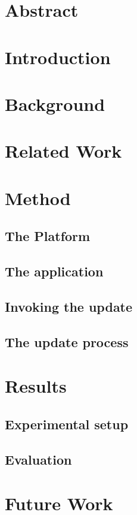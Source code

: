 \documentclass[a4paper, 12pt]{article}
\begin{document}


\setcounter{page}{2}
\tableofcontents
\newpage


\section*{Abstract}


\section{Introduction}
\section{Background}
\section{Related Work}
\section{Method}
\subsection{The Platform}
\subsection{The application}
\subsection{Invoking the update}
\subsection{The update process}

\section{Results}
\subsection{Experimental setup}
\subsection{Evaluation}

\section{Future Work}

\printbibliography
\end{document}
